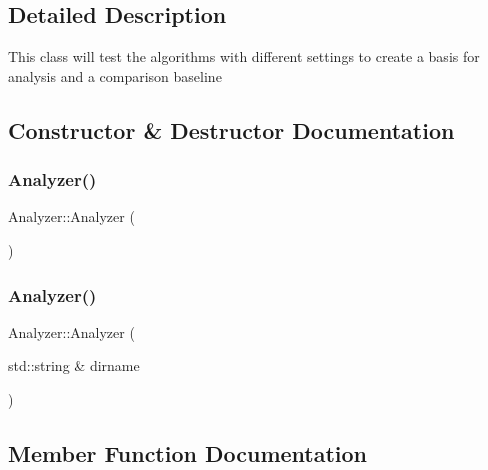 \subsection{Detailed Description}
This class will test the algorithms with different settings to create a basis for analysis and a comparison baseline 

\subsection{Constructor \& Destructor Documentation}
\mbox{\label{class_analyzer_a1be2ff17bba265bdef6e1b44748eaf96_a1be2ff17bba265bdef6e1b44748eaf96}} 
\subsubsection{\texorpdfstring{Analyzer()}{Analyzer()}\hspace{0.1cm}{\footnotesize\ttfamily [1/2]}}
{\footnotesize\ttfamily Analyzer\+::\+Analyzer (\begin{DoxyParamCaption}{ }\end{DoxyParamCaption})\hspace{0.3cm}{\ttfamily [inline]}}

\mbox{\label{class_analyzer_a2aed8194a48a8385ef271af3bd6fdd42_a2aed8194a48a8385ef271af3bd6fdd42}} 
\subsubsection{\texorpdfstring{Analyzer()}{Analyzer()}\hspace{0.1cm}{\footnotesize\ttfamily [2/2]}}
{\footnotesize\ttfamily Analyzer\+::\+Analyzer (\begin{DoxyParamCaption}\item[{std\+::string \&}]{dirname }\end{DoxyParamCaption})\hspace{0.3cm}{\ttfamily [inline]}}



\subsection{Member Function Documentation}
\mbox{\label{class_analyzer_ae4637e33a985efefebf2a10502be351c_ae4637e33a985efefebf2a10502be351c}} 
